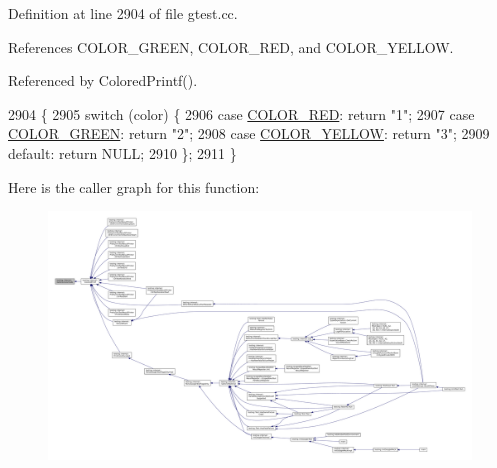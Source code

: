 Definition at line 2904 of file gtest.\+cc.



References C\+O\+L\+O\+R\+\_\+\+G\+R\+E\+EN, C\+O\+L\+O\+R\+\_\+\+R\+ED, and C\+O\+L\+O\+R\+\_\+\+Y\+E\+L\+L\+OW.



Referenced by Colored\+Printf().


\begin{DoxyCode}
2904                                                \{
2905   \textcolor{keywordflow}{switch} (color) \{
2906     \textcolor{keywordflow}{case} \hyperlink{namespacetesting_1_1internal_a648c1bc94c2ef9e868ff3f9dff0f9c4ea9ebb3ddab9391781f6ee5021e1e443c3}{COLOR\_RED}:     \textcolor{keywordflow}{return} \textcolor{stringliteral}{"1"};
2907     \textcolor{keywordflow}{case} \hyperlink{namespacetesting_1_1internal_a648c1bc94c2ef9e868ff3f9dff0f9c4ea3b1e81f5b14a17b35a8672d57d166507}{COLOR\_GREEN}:   \textcolor{keywordflow}{return} \textcolor{stringliteral}{"2"};
2908     \textcolor{keywordflow}{case} \hyperlink{namespacetesting_1_1internal_a648c1bc94c2ef9e868ff3f9dff0f9c4ea2cca441161aca75a208ff08d07f5b1a5}{COLOR\_YELLOW}:  \textcolor{keywordflow}{return} \textcolor{stringliteral}{"3"};
2909     \textcolor{keywordflow}{default}:            \textcolor{keywordflow}{return} NULL;
2910   \};
2911 \}
\end{DoxyCode}
Here is the caller graph for this function\+:
\nopagebreak
\begin{figure}[H]
\begin{center}
\leavevmode
\includegraphics[width=350pt]{namespacetesting_1_1internal_a0aefb9deb60e90f19c236559837303d8_icgraph}
\end{center}
\end{figure}
\mbox{\label{namespacetesting_1_1internal_a344160f771a3b754fa4e54b6e9846b23}} 
